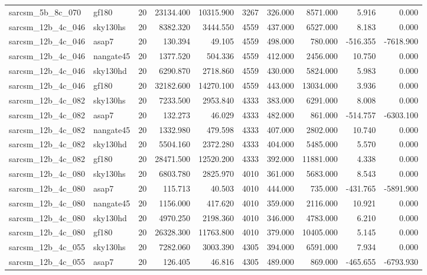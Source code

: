 \documentclass{article}
\begin{document}
\begin{longtable}{llrrrrrrrr}
sarcsm\_5b\_8c\_070 & gf180 & 20 & 23134.400 & 10315.900 & 3267 & 326.000 & 8571.000 & 5.916 & 0.000 \\
sarcsm\_12b\_4c\_046 & sky130hs & 20 & 8382.320 & 3444.550 & 4559 & 437.000 & 6527.000 & 8.183 & 0.000 \\
sarcsm\_12b\_4c\_046 & asap7 & 20 & 130.394 & 49.105 & 4559 & 498.000 & 780.000 & -516.355 & -7618.900 \\
sarcsm\_12b\_4c\_046 & nangate45 & 20 & 1377.520 & 504.336 & 4559 & 412.000 & 2456.000 & 10.750 & 0.000 \\
sarcsm\_12b\_4c\_046 & sky130hd & 20 & 6290.870 & 2718.860 & 4559 & 430.000 & 5824.000 & 5.983 & 0.000 \\
sarcsm\_12b\_4c\_046 & gf180 & 20 & 32182.600 & 14270.100 & 4559 & 443.000 & 13034.000 & 3.936 & 0.000 \\
sarcsm\_12b\_4c\_082 & sky130hs & 20 & 7233.500 & 2953.840 & 4333 & 383.000 & 6291.000 & 8.008 & 0.000 \\
sarcsm\_12b\_4c\_082 & asap7 & 20 & 132.273 & 46.029 & 4333 & 482.000 & 861.000 & -514.757 & -6303.100 \\
sarcsm\_12b\_4c\_082 & nangate45 & 20 & 1332.980 & 479.598 & 4333 & 407.000 & 2802.000 & 10.740 & 0.000 \\
sarcsm\_12b\_4c\_082 & sky130hd & 20 & 5504.160 & 2372.280 & 4333 & 404.000 & 5485.000 & 5.570 & 0.000 \\
sarcsm\_12b\_4c\_082 & gf180 & 20 & 28471.500 & 12520.200 & 4333 & 392.000 & 11881.000 & 4.338 & 0.000 \\
sarcsm\_12b\_4c\_080 & sky130hs & 20 & 6803.780 & 2825.970 & 4010 & 361.000 & 5683.000 & 8.543 & 0.000 \\
sarcsm\_12b\_4c\_080 & asap7 & 20 & 115.713 & 40.503 & 4010 & 444.000 & 735.000 & -431.765 & -5891.900 \\
sarcsm\_12b\_4c\_080 & nangate45 & 20 & 1156.000 & 417.620 & 4010 & 359.000 & 2116.000 & 10.921 & 0.000 \\
sarcsm\_12b\_4c\_080 & sky130hd & 20 & 4970.250 & 2198.360 & 4010 & 346.000 & 4783.000 & 6.210 & 0.000 \\
sarcsm\_12b\_4c\_080 & gf180 & 20 & 26328.300 & 11763.800 & 4010 & 379.000 & 10405.000 & 5.145 & 0.000 \\
sarcsm\_12b\_4c\_055 & sky130hs & 20 & 7282.060 & 3003.390 & 4305 & 394.000 & 6591.000 & 7.934 & 0.000 \\
sarcsm\_12b\_4c\_055 & asap7 & 20 & 126.405 & 46.816 & 4305 & 489.000 & 869.000 & -465.655 & -6793.930 \\

\end{longtable}
\end{document}
